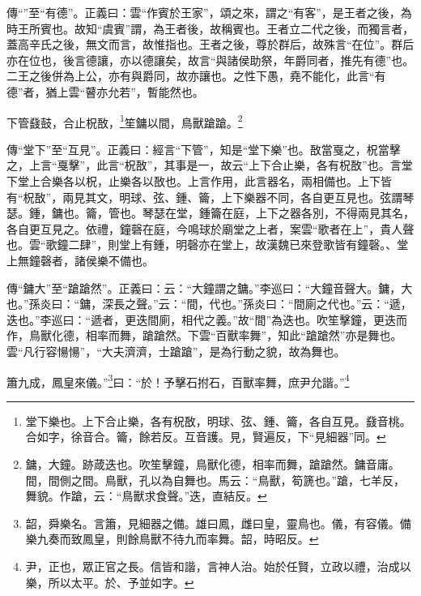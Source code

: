 {\noindent\zhuan{}\fzbyks 傳“”至“有德”。正義曰：雲“作賓於王家”，頌之來，謂之“有客”，是王者之後，為時王所賓也。故知“虞賓”謂，為王者後，故稱賓也。王者立二代之後，而獨言者，蓋高辛氏之後，無文而言，故惟指也。王者之後，尊於群后，故殊言“在位”。群后亦在位也，後言德讓，亦以德讓矣，故言“與諸侯助祭，年爵同者，推先有德”也。二王之後併為上公，亦有與爵同，故亦讓也。之性下愚，堯不能化，此言“有德”者，猶上雲“瞽亦允若”，暫能然也。 \par}

下管鼗鼓，合止柷敔，\footnote{堂下樂也。上下合止樂，各有柷敔，明球、弦、鍾、籥，各自互見。鼗音桃。合如字，徐音合。籥，餘若反。互音護。見，賢遍反，下“見細器”同。}笙鏞以間，鳥獸蹌蹌。\footnote{鏞，大鐘。跡葴迭也。吹笙擊鐘，鳥獸化德，相率而舞，蹌蹌然。鏞音庸。間，間側之間。鳥獸，孔以為自舞也。馬云：“鳥獸，筍篪也。”蹌，七羊反，舞貌。作蹌，云：“鳥獸求食聲。”迭，直結反。}


{\noindent\zhuan{}\fzbyks 傳“堂下”至“互見”。正義曰：經言“下管”，知是“堂下樂”也。敔當戛之，柷當擊之，上言“戛擊”，此言“柷敔”，其事是一，故云“上下合止樂，各有柷敔”也。言堂下堂上合樂各以柷，止樂各以敔也。上言作用，此言器名，兩相備也。上下皆有“柷敔”，兩見其文，明球、弦、鍾、籥，上下樂器不同，各自更互見也。弦謂琴瑟。鍾，鏞也。籥，管也。琴瑟在堂，鍾籥在庭，上下之器各別，不得兩見其名，各自更互見之。依禮，鐘磬在庭，今鳴球於廟堂之上者，案雲“歌者在上”，貴人聲也。雲“歌鐘二肆”，則堂上有鍾，明磬亦在堂上，故漢魏已來登歌皆有鐘磬。、堂上無鐘磬者，諸侯樂不備也。 \par}

{\noindent\zhuan{}\fzbyks 傳“鏞大”至“蹌蹌然”。正義曰：云：“大鐘謂之鏞。”李巡曰：“大鐘音聲大。鏞，大也。”孫炎曰：“鏞，深長之聲。”云：“間，代也。”孫炎曰：“間廁之代也。”云：“遞，迭也。”李巡曰：“遞者，更迭間廁，相代之義。”故“間”為迭也。吹笙擊鐘，更迭而作，鳥獸化德，相率而舞，蹌蹌然。下雲“百獸率舞”，知此“蹌蹌然”亦是舞也。雲“凡行容愓愓”，“大夫濟濟，士蹌蹌”，是為行動之貌，故為舞也。 \par}

簫九成，鳳皇來儀。”\footnote{韶，舜樂名。言簫，見細器之備。雄曰鳳，雌曰皇，靈鳥也。儀，有容儀。備樂九奏而致鳳皇，則餘鳥獸不待九而率舞。韶，時昭反。}曰：“於！予擊石拊石，百獸率舞，庶尹允諧。”\footnote{尹，正也，眾正官之長。信皆和諧，言神人治。始於任賢，立政以禮，治成以樂，所以太平。於、予並如字。}

